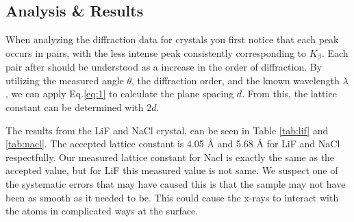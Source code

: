 \documentclass[a4paper,12pt,english]{all-in-one} %
\begin{document}
\begin{multicols}{2}
\section*{Analysis \& Results}
{
When analyzing the diffraction data for crystals you first notice that each peak occurs in pairs, with the less intense peak consistently corresponding to $K_\beta$. Each pair after should be understood as a increase in the order of diffraction. By utilizing the measured angle $\theta$, the diffraction order, and the known wavelength $\lambda$, we can apply Eq.\eqref{eq:1} to calculate the plane spacing $d$. From this, the lattice constant can be determined with $2d$.




The results from the LiF and NaCl crystal, can be seen in Table \ref{tab:lif} and \ref{tab:nacl}. The accepted lattice constant is 4.05 {\AA} and 5.68 {\AA} for LiF and NaCl respectfully. Our measured lattice constant for Nacl is exactly the same as the accepted value, but for LiF this measured value is not same. We suspect one of the systematic errors that may have caused this is that the sample may not have been as smooth as it needed to be. This could cause the x-rays to interact with the atoms in complicated ways at the surface. 


}


\end{multicols}
\end{document}
